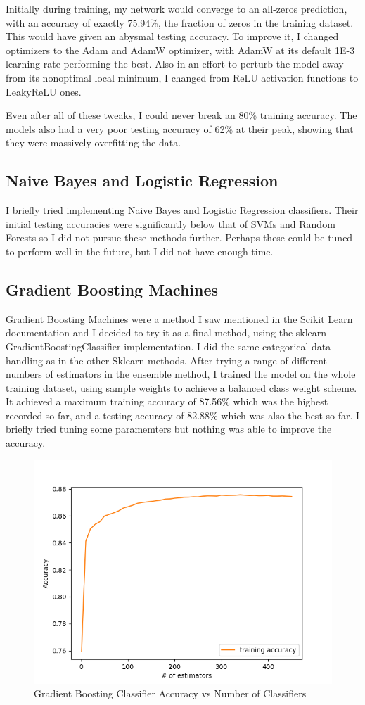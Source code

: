 \documentclass{article}
\begin{document}
Initially during training, my network would converge to an all-zeros prediction, with an accuracy of exactly 75.94\%, the fraction of zeros in the training dataset. This would have given an abysmal testing accuracy. To improve it, I changed optimizers to the Adam and AdamW optimizer, with AdamW at its default 1E-3 learning rate performing the best. Also in an effort to perturb the model away from its nonoptimal local minimum, I changed from ReLU activation functions to LeakyReLU ones.  

Even after all of these tweaks, I could never break an 80\% training accuracy. The models also had a very poor testing accuracy of 62\% at their peak, showing that they were massively overfitting the data. 

\subsection{Naive Bayes and Logistic Regression}
I briefly tried implementing Naive Bayes and Logistic Regression classifiers. Their initial testing accuracies were significantly below that of SVMs and Random Forests so I did not pursue these methods further. Perhaps these could be tuned to perform well in the future, but I did not have enough time. 

\subsection{Gradient Boosting Machines}

Gradient Boosting Machines were a method I saw mentioned in the Scikit Learn documentation and I decided to try it as a final method, using the sklearn GradientBoostingClassifier implementation. I did the same categorical data handling as in the other Sklearn methods. After trying a range of different numbers of estimators in the ensemble method, I trained the model on the whole training dataset, using sample weights to achieve a balanced class weight scheme. It achieved a maximum training accuracy of 87.56\% which was the highest recorded so far, and a testing accuracy of 82.88\% which was also the best so far. I briefly tried tuning some paramemters but nothing was able to improve the accuracy. 

\begin{figure}[h]
    \centering
    \includegraphics[width=0.4\linewidth]{img/gbm_acc.png}
    \caption{Gradient Boosting Classifier Accuracy vs Number of Classifiers}
    \label{fig:gbm}
\end{figure}
\end{document}
